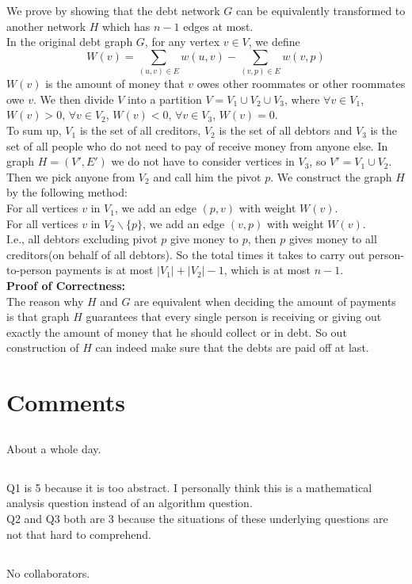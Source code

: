\documentclass[12pt,letterpaper]{article}
\begin{document}
\section{}
We prove by showing that the debt network $G$ can be equivalently transformed to 
another network $H$ which has $n-1$ edges at most.\\
In the original debt graph $G$, 
for any vertex $v\in V$, 
we define 
$$W(v)=\sum_{(u,v)\in E}w(u,v)-\sum_{(v,p)\in E}w(v,p)$$
$W(v)$ is the amount of money that $v$ owes other roommates or other roommates owe $v$.
We then divide $V$ into a partition $V=V_1\cup V_2\cup V_3$, 
where $\forall v\in V_1$, $W(v)>0$,
$\forall v\in V_2$, $W(v)<0$,
$\forall v\in V_3$, $W(v)=0$.\\
To sum up, $V_1$ is the set of all creditors, 
$V_2$ is the set of all debtors and $V_3$ is the set of all people who 
do not need to pay of receive money from anyone else.
In graph $H=(V',E')$ we do not have to consider vertices in $V_3$,
so $V'=V_1\cup V_2$.\\
Then we pick anyone from $V_2$ and call him the pivot $p$.
We construct the graph $H$ by the following method:\\
For all vertices $v$ in $V_1$, 
we add an edge $(p,v)$ with weight $W(v)$.\\
For all vertices $v$ in $V_2\backslash\{p\}$,
we add an edge $(v,p)$ with weight $W(v)$.\\
I.e., all debtors excluding pivot $p$ give money to $p$,
then $p$ gives money to all creditors(on behalf of all debtors).
So the total times it takes to carry out person-to-person payments is 
at most $|V_1|+|V_2|-1$, which is at most $n-1$.\\
\textbf{Proof of Correctness:}\\
The reason why $H$ and $G$ are equivalent when deciding the amount of payments
is that graph $H$ guarantees that every single person is 
receiving or giving out exactly the amount of money that he should collect 
or in debt.
So out construction of $H$ can indeed make sure that the debts are paid off at last.


\newpage
\section{Comments}
\subsection{}
About a whole day.
\subsection{}
Q1 is 5 because it is too abstract.
I personally think this is a mathematical analysis question instead of an algorithm question.\\
Q2 and Q3 both are 3 because the situations of these underlying questions 
are not that hard to comprehend.
\subsection{}
No collaborators.
\end{document}
